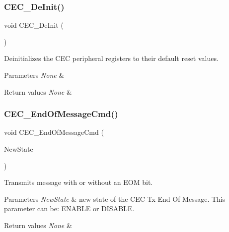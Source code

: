 \subsubsection{\texorpdfstring{CEC\_DeInit()}{CEC\_DeInit()}}
{\footnotesize\ttfamily void C\+E\+C\+\_\+\+De\+Init (\begin{DoxyParamCaption}\item[{void}]{ }\end{DoxyParamCaption})}



Deinitializes the C\+EC peripheral registers to their default reset values. 


\begin{DoxyParams}{Parameters}
{\em None} & \\
\hline
\end{DoxyParams}

\begin{DoxyRetVals}{Return values}
{\em None} & \\
\hline
\end{DoxyRetVals}
\mbox{\label{group___c_e_c___private___functions_ga1e2cf6e3a1ac891f2814f9d3f4043574}} 
\subsubsection{\texorpdfstring{CEC\_EndOfMessageCmd()}{CEC\_EndOfMessageCmd()}}
{\footnotesize\ttfamily void C\+E\+C\+\_\+\+End\+Of\+Message\+Cmd (\begin{DoxyParamCaption}\item[{\mbox{\hyperlink{group___exported__types_gac9a7e9a35d2513ec15c3b537aaa4fba1}{Functional\+State}}}]{New\+State }\end{DoxyParamCaption})}



Transmits message with or without an E\+OM bit. 


\begin{DoxyParams}{Parameters}
{\em New\+State} & new state of the C\+EC Tx End Of Message. This parameter can be\+: E\+N\+A\+B\+LE or D\+I\+S\+A\+B\+LE. \\
\hline
\end{DoxyParams}

\begin{DoxyRetVals}{Return values}
{\em None} & \\
\hline
\end{DoxyRetVals}
\mbox{\label{group___c_e_c___private___functions_gaf920706cb350182bf0728c66868053ca}} 
